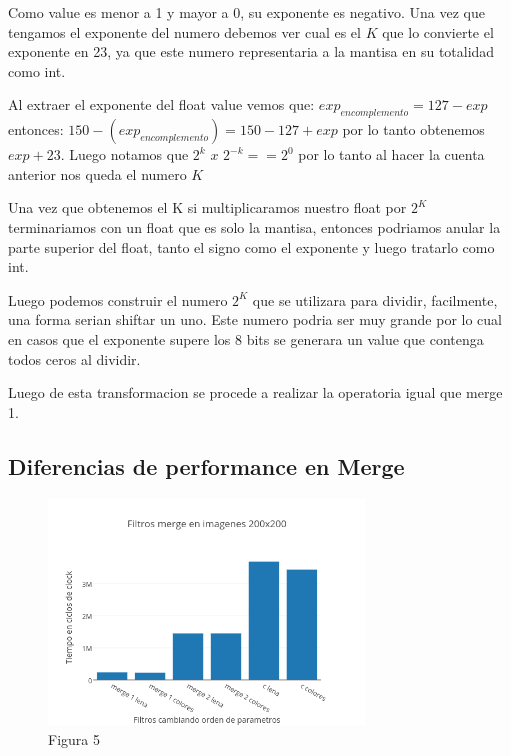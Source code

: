 \documentclass[a4paper]{article}
\begin{document}
Como value es menor a 1 y mayor a 0, su exponente es negativo.
Una vez que tengamos el exponente del numero debemos ver cual es el $K$ que lo convierte el exponente en 23, ya que este numero representaria a la mantisa en su totalidad como int.
	
Al extraer el exponente del float value vemos que:
$exp_{encomplemento}=127-exp$
entonces:
$150-(exp_{encomplemento}) = 150-127 + exp$
por lo tanto obtenemos $exp + 23$. 
Luego notamos que $2^k$ $x$ $2^{-k} == 2^0$
por lo tanto al hacer la cuenta anterior nos queda el numero $K$

Una vez que obtenemos el K si multiplicaramos nuestro float por $2^K$ terminariamos con un float que es solo la mantisa, entonces podriamos anular la parte superior del float, tanto el signo como el exponente y luego tratarlo como int.

Luego podemos construir el numero $2^K$ que se utilizara para dividir, facilmente, una forma serian shiftar un uno. Este numero podria ser muy grande por lo cual en casos que el exponente supere los 8 bits se generara un value que contenga todos ceros al dividir.

Luego de esta transformacion se procede a realizar la operatoria igual que merge 1.

\subsection{Diferencias de performance en Merge}

\begin{figure}[h]
  \centering
    \includegraphics[width=0.75\textwidth]{imagenes/FiltrosMergeEnImagenes200x200.png}
  \caption{Figura 5}
  \label{fig:graficomerge1}
\end{figure}
 \FloatBarrier
\end{document}

